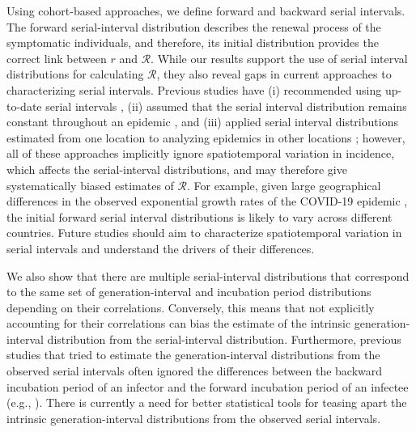 \documentclass[12pt]{article}
\newcommand{\RR}{\ensuremath{{\mathcal R}}\xspace}
\begin{document}
Using cohort-based approaches, we define forward and backward serial intervals.
The forward serial-interval distribution describes the renewal process of the symptomatic individuals, and therefore, its initial distribution  provides the correct link between $r$ and \RR.
While our results support the use of serial interval distributions for calculating \RR, 
they also reveal gaps in current approaches to characterizing serial intervals.
Previous studies have (i) recommended using up-to-date serial intervals \citep{thompson2019improved}, (ii) assumed that the serial interval distribution remains constant throughout an epidemic \citep{wallinga2004different, cori2013new}, and (iii) applied serial interval distributions estimated from one location to analyzing epidemics in other locations \citep{tempvar};
however, all of these approaches implicitly ignore spatiotemporal variation in incidence, which affects the serial-interval distributions, and may therefore give systematically biased estimates of \RR. 
For example, given large geographical differences in the observed exponential growth rates of the COVID-19 epidemic \citep{tempvar}, the initial forward serial interval distributions is likely to vary across different countries.
Future studies should aim to characterize spatiotemporal variation in serial intervals and understand the drivers of their differences.

We also show that there are multiple serial-interval distributions that correspond to the same set of generation-interval and incubation period distributions depending on their correlations.
Conversely, this means that not explicitly accounting for their correlations can bias the estimate of the intrinsic generation-interval distribution from the serial-interval distribution.
Furthermore, previous studies that tried to estimate the generation-interval distributions from the observed serial intervals often ignored the differences between the backward incubation period of an infector and the forward incubation period of an infectee (e.g., \cite{klinkenberg2011correlation, ganyani2020estimating}).
There is currently a need for better statistical tools for teasing apart the intrinsic generation-interval distributions from the observed serial intervals.
\end{document}
